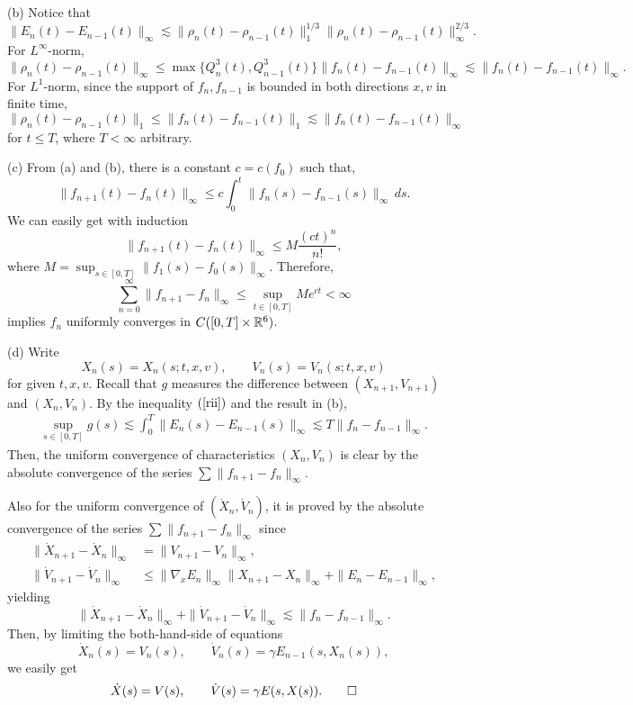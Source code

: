 \documentclass{article}
\begin{document}
\begin{pf}
(b)
Notice that
\[\|E_n(t)-E_{n-1}(t)\|_\infty\lesssim\|\rho_n(t)-\rho_{n-1}(t)\|_1^{1/3}\|\rho_n(t)-\rho_{n-1}(t)\|_\infty^{2/3}.\]
For $L^\infty$-norm,
\[\|\rho_n(t)-\rho_{n-1}(t)\|_\infty\le\max\{Q_n^3(t),Q_{n-1}^3(t)\}\|f_n(t)-f_{n-1}(t)\|_\infty\lesssim\|f_n(t)-f_{n-1}(t)\|_\infty.\]
For $L^1$-norm, since the support of $f_n,f_{n-1}$ is bounded in both directions $x,v$ in finite time,
\[\|\rho_n(t)-\rho_{n-1}(t)\|_1\le\|f_n(t)-f_{n-1}(t)\|_1\lesssim\|f_n(t)-f_{n-1}(t)\|_\infty\]
for $t\le T$, where $T<\infty$ arbitrary.

(c)
From (a) and (b), there is a constant $c=c(f_0)$ such that,
\[\|f_{n+1}(t)-f_n(t)\|_\infty\le c\int_0^t\|f_n(s)-f_{n-1}(s)\|_\infty\,ds.\]
We can easily get with induction
\[\|f_{n+1}(t)-f_n(t)\|_\infty\le M\frac{(ct)^n}{n!},\]
where $M=\sup_{s\in[0,T]}\|f_1(s)-f_0(s)\|_\infty$.
Therefore,
\[\sum_{n=0}^\infty\|f_{n+1}-f_n\|_\infty\le\sup_{t\in[0,T]}Me^{ct}<\infty\]
implies $f_n$ uniformly converges in $C([0,T]\times\mathbb{R}^6)$.

(d)
Write
\[X_n(s)=X_n(s;t,x,v),\qquad V_n(s)=V_n(s;t,x,v)\]
for given $t,x,v$.
Recall that $g$ measures the difference between $(X_{n+1},V_{n+1})$ and $(X_n,V_n)$.
By the inequality $(\ref{rii})$ and the result in (b),
\begin{align*}
\sup_{s\in[0,T]}g(s)\lesssim\int_0^T\|E_n(s)-E_{n-1}(s)\|_\infty\lesssim T\|f_n-f_{n-1}\|_\infty.
\end{align*}
Then, the uniform convergence of characteristics $(X_n,V_n)$ is clear by the absolute convergence of the series $\sum\|f_{n+1}-f_n\|_\infty$.

Also for the uniform convergence of $(\dot X_n,\dot V_n)$, it is proved by the absolute convergence of the series $\sum\|f_{n+1}-f_n\|_\infty$ since
\begin{align*}
\|\dot X_{n+1}-\dot X_n\|_\infty&=\|V_{n+1}-V_n\|_\infty,\\
\|\dot V_{n+1}-\dot V_n\|_\infty&\le\|\nabla_xE_n\|_\infty\|X_{n+1}-X_n\|_\infty+\|E_n-E_{n-1}\|_\infty,
\end{align*}
yielding
\[\|\dot X_{n+1}-\dot X_n\|_\infty+\|\dot V_{n+1}-\dot V_n\|_\infty\lesssim\|f_n-f_{n-1}\|_\infty.\]
Then, by limiting the both-hand-side of equations
\[\dot X_n(s)=V_n(s),\qquad \dot V_n(s)=\gamma E_{n-1}(s,X_n(s)),\]
we easily get
\[\dot X(s)=V(s),\qquad \dot V(s)=\gamma E(s,X(s)).\qedhere\]
\end{pf}
\end{document}
